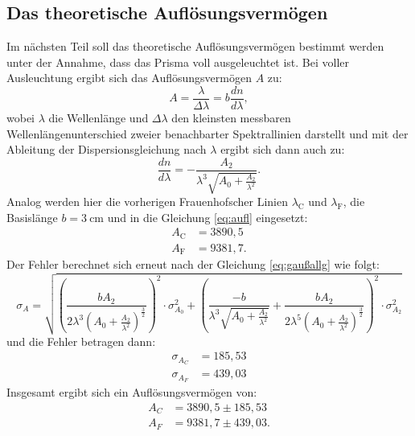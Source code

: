 \subsection{Das theoretische Auflösungsvermögen}
Im nächsten Teil soll das theoretische Auflösungsvermögen bestimmt werden unter der Annahme, dass das Prisma voll ausgeleuchtet ist. Bei voller Ausleuchtung ergibt sich das Auflösungsvermögen $A$ zu:
\begin{equation}
\label{eq:aufl}
A = \frac{\lambda}{\Delta \lambda} = b\frac{dn}{d\lambda},
\end{equation}
wobei $\lambda$ die Wellenlänge und $\Delta \lambda$ den kleinsten messbaren Wellenlängenunterschied zweier benachbarter Spektrallinien darstellt und mit der Ableitung der Dispersionsgleichung nach $\lambda$ ergibt sich dann auch zu:
\begin{equation}
\frac{dn}{d\lambda} = - \frac{A_2}{\lambda^3 \sqrt{A_0 +\frac{A_2}{\lambda^2}}}.
\end{equation}
Analog werden hier die vorherigen Frauenhofscher Linien $\lambda_\text{C}$ und $\lambda_\text{F}$, die Basislänge $b = \SI{3}{\cm}$ und in die Gleichung \ref{eq:aufl} eingesetzt:
\begin{align*}
A_\text{C} &= 3890,5 \\
A_\text{F} &= 9381,7.
\end{align*}
Der Fehler berechnet sich erneut nach der Gleichung \ref{eq:gaußallg} wie folgt:
\begin{equation}
\sigma_A = \sqrt{\left(\frac{bA_2}{2\lambda^3(A_0+\frac{A_2}{\lambda^2})^{\frac{3}{2}}}\right)^2 \cdot \sigma^2_{A_0} + \left(\frac{-b}{\lambda^3\sqrt{A_0+\frac{A_2}{\lambda^2}}}+\frac{bA_2}{2\lambda^5(A_0+\frac{A_2}{\lambda^2})^{\frac{3}{2}}} \right)^2 \cdot \sigma^2_{A_2}} 
\end{equation}
und die Fehler betragen dann:
\begin{align*}
\sigma_{A_C} &= 185,53 \\
\sigma_{A_F} &= 439,03
\end{align*}
Insgesamt ergibt sich ein Auflösungsvermögen von:
\begin{align*}
A_C &= 3890,5 \pm 185,53 \\
A_F &= 9381,7 \pm 439,03.
\end{align*}

